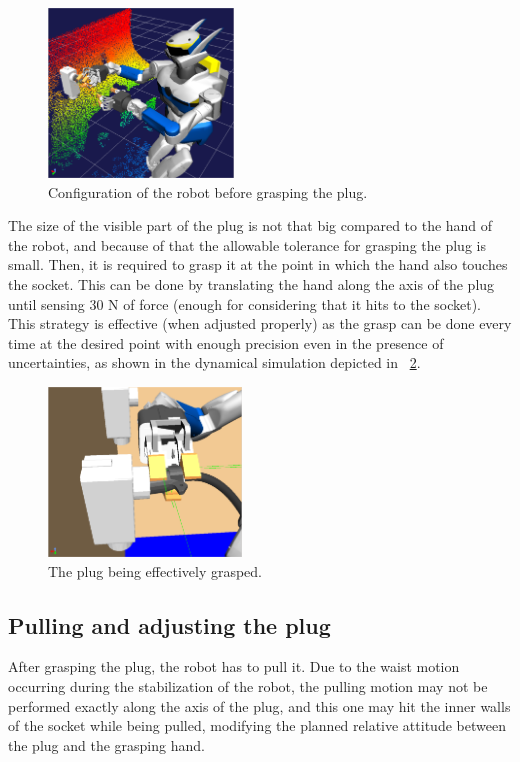 		\begin{figure}[t]
			\centering
			\includegraphics[height = 4.5cm]{img/PreCloseHand}
			\caption{Configuration of the robot before grasping the plug.}
			\label{fig:PreCloseHand}
		\end{figure}
		
		The size of the visible part of the plug is not that big compared to the hand of the robot,
		and because of that the allowable tolerance for grasping the plug is small.
		Then, it is required to grasp it at the point in which the hand also touches the socket.
		This can be done by translating the hand along the axis of the plug until sensing 30 N of force
		(enough for considering that it hits to the socket).
		This strategy is effective (when adjusted properly) as the grasp can be done every time at the
		desired point with enough precision even in the presence of uncertainties, as shown in the dynamical
		simulation depicted	in \figurename~\ref{fig:GraspPlug}.
		
		\begin{figure}[b]
			\centering
			\includegraphics[height = 4.5cm]{img/GraspPlug}
			\caption{The plug being effectively grasped.}
			\label{fig:GraspPlug}
		\end{figure}
		
	\subsection{Pulling and adjusting the plug}
		
		After grasping the plug, the robot has to pull it.
		Due to the waist motion occurring during the stabilization of the robot, the pulling motion may not
		be performed exactly along the axis of the plug, and this one may hit the inner walls of the socket
		while being pulled, modifying the planned relative attitude between the plug and the grasping hand.
		
